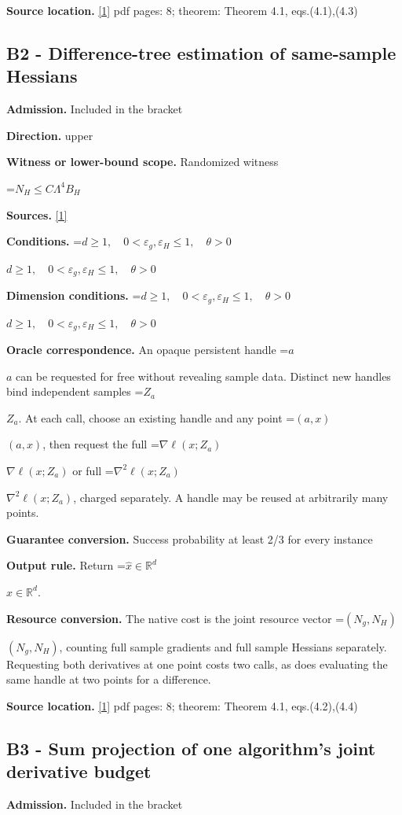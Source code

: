 \documentclass[10pt,a4paper]{article}
\newcommand{\AtlasMath}[1]{\par\begingroup\centering\setbox0=\hbox{$\displaystyle #1$}\ifdim\wd0>1.4\linewidth\typeout{ATLAS WIDE FORMULA: \the\wd0}\fi\ifdim\wd0>\linewidth\resizebox{\linewidth}{!}{\box0}\else\box0\fi\par\endgroup}
\newcommand{\AtlasInlineMath}[1]{\begingroup\setbox0=\hbox{$#1$}\ifdim\wd0>.4\linewidth\endgroup\AtlasMath{#1}\else\endgroup$#1$\fi}
\begin{document}
\textbf{Source location.} \href{https://arxiv.org/pdf/2610.16832v2}{[1]} pdf pages: 8; theorem: Theorem 4.1, eqs.(4.1),(4.3)

\subsection{B2 - Difference-tree estimation of same-sample Hessians}
\textbf{Admission.} Included in the bracket

\textbf{Direction.} upper

\textbf{Witness or lower-bound scope.} Randomized witness

\AtlasMath{N_H\le C\Lambda^4 B_H}
\textbf{Sources.} \href{https://arxiv.org/pdf/2610.16832v2}{[1]}

\textbf{Conditions.} \AtlasInlineMath{d\ge1,\quad0<\varepsilon_g,\varepsilon_H\le1,\quad\theta>0}

\textbf{Dimension conditions.} \AtlasInlineMath{d\ge1,\quad0<\varepsilon_g,\varepsilon_H\le1,\quad\theta>0}

\textbf{Oracle correspondence.} An opaque persistent handle \AtlasInlineMath{a} can be requested for free without revealing sample data. Distinct new handles bind independent samples \AtlasInlineMath{Z_a}. At each call, choose an existing handle and any point \AtlasInlineMath{(a,x)}, then request the full \AtlasInlineMath{\nabla\ell(x;Z_a)} or full \AtlasInlineMath{\nabla^2\ell(x;Z_a)}, charged separately. A handle may be reused at arbitrarily many points.

\textbf{Guarantee conversion.} Success probability at least 2/3 for every instance

\textbf{Output rule.} Return \AtlasInlineMath{\widehat{x}\in \mathbb{R}^d}.

\textbf{Resource conversion.} The native cost is the joint resource vector \AtlasInlineMath{(N_g,N_H)}, counting full sample gradients and full sample Hessians separately. Requesting both derivatives at one point costs two calls, as does evaluating the same handle at two points for a difference.

\textbf{Source location.} \href{https://arxiv.org/pdf/2610.16832v2}{[1]} pdf pages: 8; theorem: Theorem 4.1, eqs.(4.2),(4.4)

\subsection{B3 - Sum projection of one algorithm's joint derivative budget}
\textbf{Admission.} Included in the bracket
\end{document}
